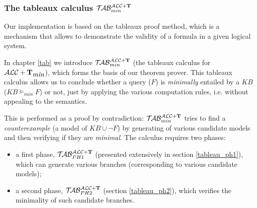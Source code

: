 \documentclass[a4paper, 11pt, oneside]{duthesis}
\newcommand{\tip}{{\bf T}}
\newcommand{\alctmin}{\mathcal{ALC}+\tip_{\mbox{\em min}}}
\newcommand{\nuovoc}{\mathrel{{\mathcal{T}\!\mathcal{AB}}}_{min}^{\mathcal{ALC}+\mbox{\scriptsize $\tip$}}}
\newcommand{\primo}{\mathrel{{\mathcal{T}\!\mathcal{AB}}}_{PH 1}^{\mathcal{ALC}+\mbox{\scriptsize $\tip$}}}
\newcommand{\secondo}{\mathrel{{\mathcal{T}\!\mathcal{AB}}}_{PH 2}^{\mathcal{ALC}+\mbox{\scriptsize $\tip$}}}
\begin{document}




%

%

\subsubsection{The tableaux calculus $\nuovoc$}

Our implementation is based on the tableaux proof method, which is a mechanism that allows to demonstrate the validity of a formula in a given logical system.

In chapter \ref{tab} we introduce $\nuovoc$ (the tableaux calculus for $\alctmin$), which forms the basis of our theorem prover. This tableaux calculus allows us to conclude whether a query ($F$) is \emph{minimally} entailed by a $KB$ ($KB \models_{min} F$) or not, just by applying the various computation rules, i.e. without appealing to the semantics.

This is performed as a proof by contradiction: $\nuovoc$ tries to find a \emph{counterexample} (a model of $KB \cup \neg F$) by generating of various candidate models and then verifying if they are \emph{minimal}.
The calculus requires two phases: 
\begin{itemize}
\item a first phase, $\primo$ (presented extensively in section \ref{tableau_ph1}), which can generate various branches (corresponding to various candidate models);
\item a second phase, $\secondo$ (section \ref{tableau_ph2}), which verifies the minimality of such candidate branches.
\end{itemize}
\end{document}

